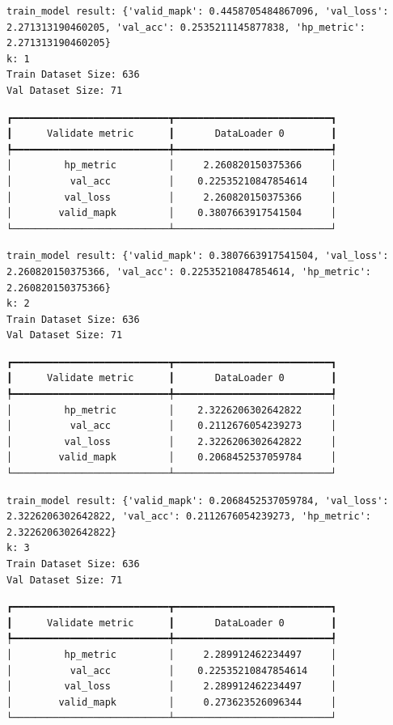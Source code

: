 \documentclass[
  letterpaper,
  DIV=11,
  numbers=noendperiod]{scrreprt}
\begin{document}
\begin{verbatim}
train_model result: {'valid_mapk': 0.4458705484867096, 'val_loss': 2.271313190460205, 'val_acc': 0.2535211145877838, 'hp_metric': 2.271313190460205}
k: 1
Train Dataset Size: 636
Val Dataset Size: 71
\end{verbatim}

\begin{verbatim}
┏━━━━━━━━━━━━━━━━━━━━━━━━━━━┳━━━━━━━━━━━━━━━━━━━━━━━━━━━┓
┃      Validate metric      ┃       DataLoader 0        ┃
┡━━━━━━━━━━━━━━━━━━━━━━━━━━━╇━━━━━━━━━━━━━━━━━━━━━━━━━━━┩
│         hp_metric         │     2.260820150375366     │
│          val_acc          │    0.22535210847854614    │
│         val_loss          │     2.260820150375366     │
│        valid_mapk         │    0.3807663917541504     │
└───────────────────────────┴───────────────────────────┘
\end{verbatim}

\begin{verbatim}
train_model result: {'valid_mapk': 0.3807663917541504, 'val_loss': 2.260820150375366, 'val_acc': 0.22535210847854614, 'hp_metric': 2.260820150375366}
k: 2
Train Dataset Size: 636
Val Dataset Size: 71
\end{verbatim}

\begin{verbatim}
┏━━━━━━━━━━━━━━━━━━━━━━━━━━━┳━━━━━━━━━━━━━━━━━━━━━━━━━━━┓
┃      Validate metric      ┃       DataLoader 0        ┃
┡━━━━━━━━━━━━━━━━━━━━━━━━━━━╇━━━━━━━━━━━━━━━━━━━━━━━━━━━┩
│         hp_metric         │    2.3226206302642822     │
│          val_acc          │    0.2112676054239273     │
│         val_loss          │    2.3226206302642822     │
│        valid_mapk         │    0.2068452537059784     │
└───────────────────────────┴───────────────────────────┘
\end{verbatim}

\begin{verbatim}
train_model result: {'valid_mapk': 0.2068452537059784, 'val_loss': 2.3226206302642822, 'val_acc': 0.2112676054239273, 'hp_metric': 2.3226206302642822}
k: 3
Train Dataset Size: 636
Val Dataset Size: 71
\end{verbatim}

\begin{verbatim}
┏━━━━━━━━━━━━━━━━━━━━━━━━━━━┳━━━━━━━━━━━━━━━━━━━━━━━━━━━┓
┃      Validate metric      ┃       DataLoader 0        ┃
┡━━━━━━━━━━━━━━━━━━━━━━━━━━━╇━━━━━━━━━━━━━━━━━━━━━━━━━━━┩
│         hp_metric         │     2.289912462234497     │
│          val_acc          │    0.22535210847854614    │
│         val_loss          │     2.289912462234497     │
│        valid_mapk         │     0.273623526096344     │
└───────────────────────────┴───────────────────────────┘
\end{verbatim}
\end{document}
